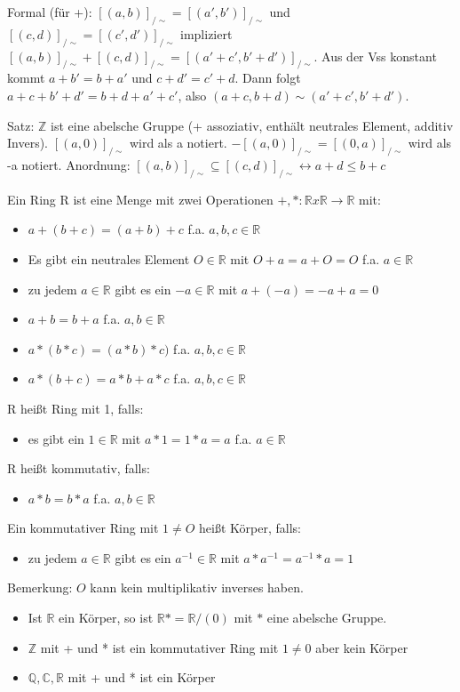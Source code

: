 \documentclass[10pt,landscape]{article}
\begin{document}
\begin{multicols}{3}
Formal (für +): $[(a,b)]_{/\sim } = [(a',b')]_{/\sim }$ und $[(c,d)]_{/\sim } = [(c',d')]_{/\sim }$ impliziert $[(a,b)]_{/\sim } + [(c,d)]_{/\sim } = [(a'+c', b'+d')]_{/\sim }$. Aus der Vss konstant kommt $a+b'=b+a'$ und $c+d'=c'+d$. Dann folgt $a+c+b'+d'=b+d+a'+c'$, also $(a+c, b+d)\sim (a'+c',b'+d')$.

Satz: $\mathbb{Z}$ ist eine abelsche Gruppe (+ assoziativ, enthält neutrales Element, additiv Invers).
$[(a,0)]_{/\sim }$ wird als a notiert. $-[(a,0)]_{/\sim }=[(0,a)]_{/\sim }$ wird als -a notiert.
Anordnung: $[(a,b)]_{/\sim } \subseteq [(c,d)]_{/\sim } \leftrightarrow a+d\leq b+c$

Ein Ring R ist eine Menge mit zwei Operationen $+,*: \mathbb{R} x \mathbb{R} \rightarrow \mathbb{R}$ mit:
\begin{itemize}
    \item $a+(b+c) = (a+b)+c$ f.a. $a,b,c\in \mathbb{R}$
    \item Es gibt ein neutrales Element $O\in \mathbb{R}$ mit $O+a=a+O=O$ f.a. $a\in\mathbb{R}$
    \item zu jedem $a\in \mathbb{R}$ gibt es ein $-a\in \mathbb{R}$ mit $a+(-a)=-a+a=0$
    \item $a+b=b+a$ f.a. $a,b\in\mathbb{R}$
    \item $a*(b*c)=(a*b)*c)$ f.a. $a,b,c\in\mathbb{R}$
    \item $a*(b+c)=a*b+a*c$ f.a. $a,b,c\in\mathbb{R}$
\end{itemize}
R heißt Ring mit 1, falls:
\begin{itemize} 
    \item es gibt ein $1\in\mathbb{R}$ mit $a*1=1*a=a$ f.a. $a\in\mathbb{R}$
\end{itemize}
R heißt kommutativ, falls:
\begin{itemize}
    \item $a*b=b*a$ f.a. $a,b\in\mathbb{R}$
\end{itemize}
Ein kommutativer Ring mit $1\not=O$ heißt Körper, falls:
\begin{itemize}
    \item zu jedem $a\in\mathbb{R}$ gibt es ein $a^{-1}\in\mathbb{R}$ mit $a*a^{-1}=a^{-1}*a=1$
\end{itemize}

Bemerkung: $O$ kann kein multiplikativ inverses haben.
\begin{itemize}
    \item Ist $\mathbb{R}$ ein Körper, so ist $\mathbb{R}*=\mathbb{R} /(0)$ mit $*$ eine abelsche Gruppe.
    \item $\mathbb{Z}$ mit + und * ist ein kommutativer Ring mit $1 \not= 0$ aber kein Körper
    \item $\mathbb{Q}, \mathbb{C}, \mathbb{R}$ mit + und * ist ein Körper
\end{itemize}


\end{multicols}
\end{document}
